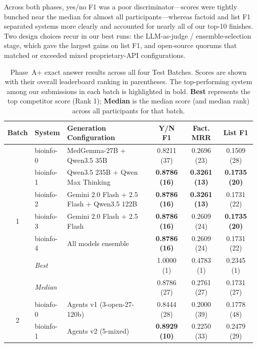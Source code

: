 Across both phases, yes/no F1 was a poor discriminator---scores were tightly bunched
near the median for almost all participants---whereas factoid and list F1 separated
systems more clearly and accounted for nearly all of our top-10 finishes. Two design
choices recur in our best runs: the LLM-as-judge / ensemble-selection stage, which
gave the largest gains on list F1, and open-source quorums that matched or exceeded
mixed proprietary-API configurations.

\begin{table}[ht]
  \centering
  \caption{Phase~A+ exact answer results across all four Test Batches. Scores are shown with their overall leaderboard ranking in parentheses. The top-performing system among our submissions in each batch is highlighted in bold. \textbf{Best} represents the top competitor score (Rank 1); \textbf{Median} is the median score (and median rank) across all participants for that batch.}
  \label{tab:phaseap-exact-all}
  \footnotesize
  \begin{tabular}{cl|p{5.8cm}|ccc}
    \toprule
    \textbf{Batch} & \textbf{System} & \textbf{Generation Configuration} & \textbf{Y/N F1} & \textbf{Fact. MRR} & \textbf{List F1} \\
    \midrule
    \multirow{7}{*}{1}
    & bioinfo-0 & MedGemma-27B + Qwen3.5 35B & 0.8211 (37) & 0.2696 (23) & 0.1509 (28) \\
    & bioinfo-1 & Qwen3.5 235B + Qwen Max Thinking & \textbf{0.8786 (16)} & \textbf{0.3261 (13)} & \textbf{0.1735 (20)} \\
    & bioinfo-2 & Gemini 2.0 Flash + 2.5 Flash + Qwen3.5 122B & \textbf{0.8786 (16)} & \textbf{0.3261 (13)} & 0.1731 (22) \\
    & bioinfo-3 & Gemini 2.0 Flash + 2.5 Flash & \textbf{0.8786 (16)} & 0.2609 (24) & \textbf{0.1735 (20)} \\
    & bioinfo-4 & All models ensemble & \textbf{0.8786 (16)} & 0.2609 (24) & 0.1731 (22) \\
    \cmidrule(l){2-6}
    & \textit{Best} & \multicolumn{1}{l|}{} & 1.0000 (1) & 0.4783 (1) & 0.2345 (1) \\
    & \textit{Median}& \multicolumn{1}{l|}{} & 0.8786 (27) & 0.2761 (27) & 0.1731 (27) \\
    \midrule
    \multirow{7}{*}{2}
    & bioinfo-0 & Agents v1 (3-open-27-120b) & 0.8444 (28) & 0.2000 (39) & 0.1778 (48) \\
    & bioinfo-1 & Agents v2 (5-mixed) & \textbf{0.8929 (10)} & 0.2250 (33) & 0.2479 (29) \\

\end{tabular}
\end{table}
